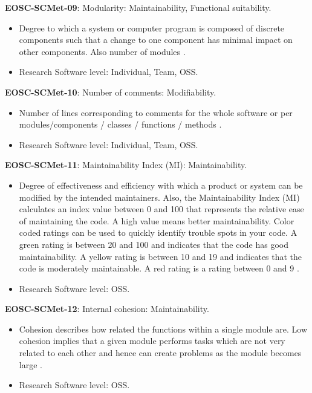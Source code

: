 \textbf{EOSC-SCMet-09}: Modularity: Maintainability, Functional suitability.

\begin{itemize}
    \item Degree to which a system or computer program is composed of discrete components such that a change to one component has minimal impact on other components. Also number of modules \cite{iso_25010_2011_2017,montagud_systematic_2012,aberdour_achieving_2007,ogasawara_experiences_1996,shepherdson_cessda_2019}.
    \item Research Software level: Individual, Team, OSS.
\end{itemize}

\textbf{EOSC-SCMet-10}: Number of comments: Modifiability.

\begin{itemize}
    \item Number of lines corresponding to comments for the whole software or per modules/components / classes / functions / methods \cite{srisopha_software_2018,montagud_systematic_2012,ogasawara_experiences_1996}.
    \item Research Software level: Individual, Team, OSS.
\end{itemize}

\textbf{EOSC-SCMet-11}: Maintainability Index (MI): Maintainability.

\begin{itemize}
    \item Degree of effectiveness and efficiency with which a product or system can be modified by the intended maintainers. Also, the Maintainability Index (MI) calculates an index value between 0 and 100 that represents the relative ease of maintaining the code. A high value means better maintainability. Color coded ratings can be used to quickly identify trouble spots in your code. A green rating is between 20 and 100 and indicates that the code has good maintainability. A yellow rating is between 10 and 19 and indicates that the code is moderately maintainable. A red rating is a rating between 0 and 9 \cite{iso_25010_2011_2017,montagud_systematic_2012}.
    \item Research Software level: OSS.
\end{itemize}

\textbf{EOSC-SCMet-12}: Internal cohesion: Maintainability.

\begin{itemize}
    \item Cohesion describes how related the functions within a single module are. Low cohesion implies that a given module performs tasks which are not very related to each other and hence can create problems as the module becomes large \cite{iso_iec_24765_2017,montagud_systematic_2012}.
    \item Research Software level: OSS.
\end{itemize}

